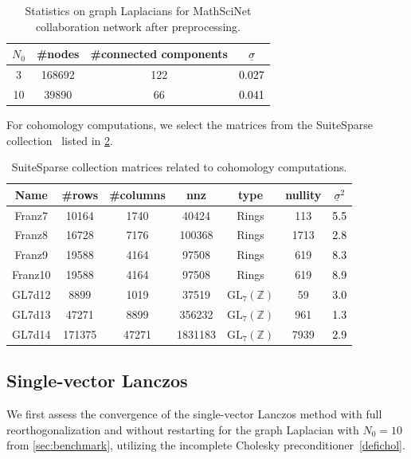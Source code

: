 \documentclass{siamart190516}
\newcommand{\edit}[1]{\textcolor{black}{#1}} %
\begin{document}
\begin{table}[htbp]
    \centering
    \caption{Statistics on graph Laplacians for MathSciNet collaboration network after preprocessing.}
    \label{tabLap}
    \begin{tabular}{|c|c|c|c|}
        \hline
        $N_{0}$ & \#nodes & \#connected components & \edit{$\underline{\sigma}$}\\ \hline 
        3 & 168692 & 122 &\edit{0.027} \\ \hline 
        10 & 39890 & 66 & \edit{0.041}\\ \hline 
    \end{tabular}
\end{table}

For cohomology computations, we select the matrices from the SuiteSparse collection~\cite{Davis2011} listed in \cref{tabSSmatrices}.
\begin{table}[htbp]
    \centering
    \caption{SuiteSparse collection matrices related to cohomology computations.}
    \label{tabSSmatrices}
    \begin{tabular}{|c|c|c|c|c|c|c|}
        \hline
        Name & \#rows & \#columns & nnz & type & nullity & \edit{$\underline{\sigma}^{2}$} \\ \hline 
        Franz7 & 10164 & 1740 & 40424 & Rings & 113 &\edit{5.5}\\ \hline
        Franz8 & 16728 & 7176 & 100368 & Rings & 1713 &\edit{2.8}\\ \hline
        Franz9 & 19588 & 4164 & 97508 & Rings & 619 &\edit{8.3}\\ \hline
        Franz10 & 19588 & 4164 & 97508 & Rings & 619 &\edit{8.9}\\  \hline
        GL7d12 & 8899 & 1019 & 37519 & $\mathrm{GL}_{7}(\mathbb{Z})$ & 59&\edit{3.0}\\ \hline 
        GL7d13 & 47271 & 8899 & 356232 & $\mathrm{GL}_{7}(\mathbb{Z})$ & 961&\edit{1.3}\\ \hline
        GL7d14 & 171375& 47271  & 1831183 & $\mathrm{GL}_{7}(\mathbb{Z})$ & 7939&\edit{2.9}\\ \hline
    \end{tabular}
\end{table}

\subsection{Single-vector Lanczos}

We first assess the convergence of the single-vector Lanczos method with full reorthogonalization and without restarting for the graph Laplacian with $N_{0}=10$ from \cref{sec:benchmark}, utilizing the incomplete Cholesky preconditioner~\cref{defichol}.
\end{document}
